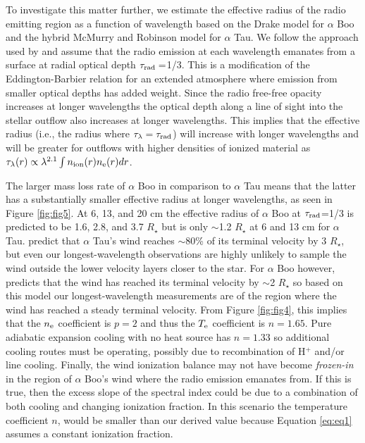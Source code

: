 \documentclass[iop]{emulateapj}
\begin{document}
To investigate this matter further,  we estimate the effective radius of the radio emitting region as a function of wavelength based on the Drake model for $\alpha$ Boo and the hybrid McMurry and Robinson model for $\alpha$ Tau. We follow the approach used by \cite{1977ApJ...212..488C} and assume that the radio emission at each wavelength emanates from a surface at radial optical depth $\tau _{\rm{rad}}=$1/3. This is a modification of the Eddington-Barbier relation for an extended atmosphere where emission from smaller optical depths has added weight. Since the radio free-free opacity increases at longer wavelengths the optical depth along a line of sight into the stellar outflow also increases at longer wavelengths. This implies that the effective radius (i.e., the radius where $\tau _{\lambda} = \tau _{\rm{rad}}$) will increase with longer wavelengths and will be greater for outflows with higher densities of ionized material as $\tau _{\lambda}(r) \propto \lambda ^{2.1} \int n_{\rm{ion}}(r)n_{\rm{e}}(r) dr$. 

The larger mass loss rate of $\alpha$ Boo in comparison to $\alpha$ Tau means that the latter has a substantially smaller effective radius at longer wavelengths, as seen in Figure \ref{fig:fig5}. At 6, 13, and 20 cm the effective radius of $\alpha$ Boo at $\tau _{\rm{rad}}$=1/3 is predicted to be 1.6, 2.8, and 3.7 $R_{\star}$ but is only $\sim$1.2 $R_{\star}$ at 6 and 13 cm for $\alpha$ Tau. \cite{1998ApJ...503..396R} predict that $\alpha$ Tau's wind reaches $\sim$80\% of its terminal velocity by 3 $R_{\star}$, but even our longest-wavelength observations are highly unlikely to sample the wind outside the lower velocity layers closer to the star. For $\alpha$ Boo however, \cite{1985pssl.proc..351D} predicts that the wind has reached its terminal velocity by $\sim$2 $R_{\star}$ so based on this model our longest-wavelength measurements are of the region where the wind has reached a steady terminal velocity. From Figure \ref{fig:fig4}, this implies that the $n_{\rm{e}}$ coefficient is $p=2$ and thus the $T_{\rm{e}}$ coefficient is $n=1.65$. Pure adiabatic expansion cooling with no heat source has $n=1.33$ so additional cooling routes must be operating, possibly due to recombination of H$^{+}$ and/or line cooling. Finally, the wind ionization balance may not have become \textit{frozen-in} in the region of $\alpha$ Boo's wind where the radio emission emanates from. If this is true, then the excess slope of the spectral index could be due to a combination of both cooling and changing ionization fraction. In this scenario the temperature coefficient $n$, would be smaller than our derived value because Equation \ref{eq:eq1} assumes a constant ionization fraction.
\end{document}
